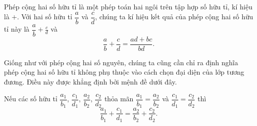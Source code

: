 \begin{definition}
    Phép cộng hai số hữu tỉ là một phép toán hai ngôi trên tập hợp số hữu tỉ, kí hiệu là $+$. Với hai số hữu tỉ $\dfrac{a}{b}$ và $\dfrac{c}{d}$, chúng ta kí hiệu kết quả của phép cộng hai số hữu tỉ này là $\dfrac{a}{b} + \frac{c}{d}$ và
    \[
        \frac{a}{b} + \frac{c}{d} = \frac{a d + b c}{b d}.
    \]
\end{definition}

Giống như với phép cộng hai số nguyên, chúng ta cũng cần chỉ ra định nghĩa phép cộng hai số hữu tỉ không phụ thuộc vào cách chọn đại diện của lớp tương đương. Điều này được khẳng định bởi mệnh đề dưới đây.
\begin{proposition}
    Nếu các số hữu tỉ $\dfrac{a_{1}}{b_{1}}$, $\dfrac{c_{1}}{d_{1}}$, $\dfrac{a_{2}}{b_{2}}$, $\dfrac{c_{2}}{d_{2}}$ thỏa mãn $\dfrac{a_{1}}{b_{1}} = \dfrac{a_{2}}{b_{2}}$ và $\dfrac{c_{1}}{d_{1}} = \dfrac{c_{2}}{d_{2}}$ thì
    \[
        \frac{a_{1}}{b_{1}} + \frac{c_{1}}{d_{1}} = \frac{a_{2}}{b_{2}} + \frac{c_{2}}{d_{2}}.
    \]
\end{proposition}

